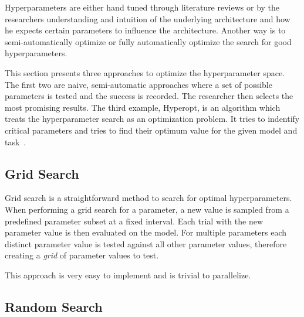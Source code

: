 Hyperparameters are either hand tuned through literature reviews or by the researchers understanding and intuition of the underlying architecture and how he expects certain parameters to influence the architecture. Another way is to semi-automatically optimize or fully automatically optimize the search for good hyperparameters.
\bigskip

This section presents three approaches to optimize the hyperparameter space. The first two are naive, semi-automatic approaches where a set of possible parameters is tested and the success is recorded. The researcher then selects the most promising results. The third example, Hyperopt, is an algorithm which treats the hyperparameter search as an optimization problem. It tries to indentify critical parameters and tries to find their optimum value for the given model and task~\cite{Bergstra2013}.


\subsection{Grid Search}

Grid search is a straightforward method to search for optimal hyperparameters. When performing a grid search for a parameter, a new value is sampled from a predefined parameter subset at a fixed interval. Each trial with the new parameter value is then evaluated on the model. For multiple parameters each distinct parameter value is tested against all other parameter values, therefore creating a \textit{grid} of parameter values to test.

This approach is very easy to implement and is trivial to parallelize.

\subsection{Random Search}


